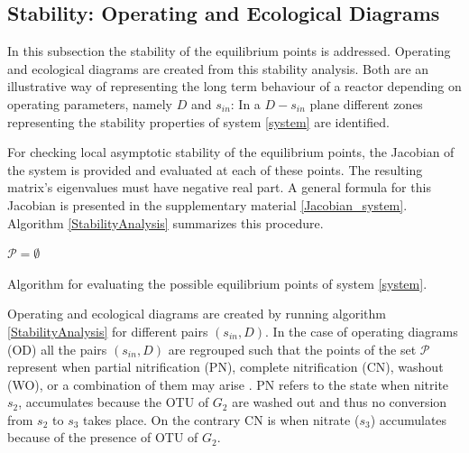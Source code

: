 \documentclass[3p,times]{article}
\newcommand{\N}{\mathbb{N}}
\newcommand{\R}{\mathbb{R}}
\begin{document}
\subsection{Stability: Operating and Ecological Diagrams}

In this subsection the stability of the equilibrium points is addressed. Operating and ecological diagrams are created from this stability analysis. Both are an illustrative way of representing the long term behaviour of a reactor depending on operating parameters, namely $D$ and $s_{in}$: In a $D-s_{in}$ plane different zones representing the stability properties of system \eqref{system} are identified. 

For checking local asymptotic stability of the equilibrium points, the Jacobian of the system is provided and evaluated at each of these points. The resulting matrix's eigenvalues must have negative real part. A general formula for this Jacobian is presented in the supplementary material \eqref{Jacobian_system}. Algorithm \ref{StabilityAnalysis} summarizes this procedure.

\begin{algorithm}[H]
	\KwData{$A \in M_{n\times n}(\R)$, $D, s_{in}, \bar{\mu}_i,K_i, k_i,  \in \R \, i\in [n], $, $n_1, n_2 \in \N$}
	$\mathcal{P} = \emptyset$ \\
	\label{StabilityAnalysis}
	\caption{Algorithm for evaluating the possible equilibrium points of system \eqref{system}.}
\end{algorithm}


Operating and ecological diagrams are created by running algorithm \ref{StabilityAnalysis} for different pairs $(s_{in},D)$. In the case of operating diagrams\cite{lobry2017chemostat} (OD) all the pairs $(s_{in},D)$ are regrouped such that the points of the set $\mathcal{P}$ represent when partial nitrification (PN), complete nitrification (CN), washout (WO), or a combination of them may arise \cite{KHIN2004519}. PN refers to the state when nitrite $s_2$, accumulates because the OTU of $G_2$ are washed out and thus no conversion from $s_2$  to $s_3$ takes place. On the contrary CN is when nitrate ($s_3$) accumulates because of the presence of OTU of $G_2$. 
\end{document}
